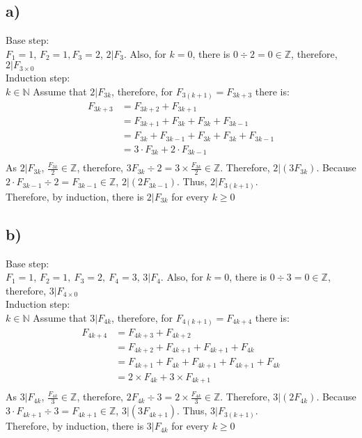 \documentclass{article}
\begin{document}
    \subsection*{a)}
        Base step:\\
        \(F_1=1\), \(F_2=1, F_3=2\), \(2|F_3\). Also, for \(k=0\), there is \(0\div 2 =0\in \mathbb{Z}\), therefore, \(2|F_{3\times 0}\)\\
        Induction step:\\
        \(k\in \mathbb{N}\) Assume that \(2|F_{3k}\), therefore, for \(F_{3(k+1)}=F_{3k+3}\) there is:
        \begin{align*}
            F_{3k+3}&=F_{3k+2}+F_{3k+1}\\
                    &=F_{3k+1}+F_{3k}+F_{3k}+F_{3k-1}\\
                    &=F_{3k}+F_{3k-1}+F_{3k}+F_{3k}+F_{3k-1}\\
                    &=3\cdot F_{3k}+2\cdot F_{3k-1}\\
        \end{align*}
        As \(2|F_{3k}\), \(\displaystyle{\frac{F_{3k}}{2}\in \mathbb{Z}}\), therefore, \(3F_{3k} \div 2=3\times \frac{F_{3k}}{2}\in \mathbb{Z}\).
        Therefore, \(2|(3 F_{3k})\). Because \(2\cdot F_{3k-1} \div 2 = F_{3k-1}\in \mathbb{Z}\), \(2|(2 F_{3k-1})\).
        Thus, \(2|F_{3(k+1)}\).\\Therefore, by induction, there is \(2|F_{3k}\) for every \(k\geqslant 0\)
    \subsection*{b)}
    Base step:\\
        \(F_1=1\), \(F_2=1,\  F_3=2,\ F_4=3\), \(3|F_4\). Also, for \(k=0\), there is \(0\div 3 =0\in \mathbb{Z}\), therefore, \(3|F_{4\times 0}\)\\
        Induction step:\\
        \(k\in \mathbb{N}\) Assume that \(3|F_{4k}\), therefore, for \(F_{4(k+1)}=F_{4k+4}\) there is:\\
        \begin{align*}
            F_{4k+4}&=F_{4k+3}+F_{4k+2}\\
                    &=F_{4k+2}+F_{4k+1}+F_{4k+1}+F_{4k}\\
                    &=F_{4k+1}+F_{4k}+F_{4k+1}+F_{4k+1}+F_{4k}\\
                    &=2\times F_{4k}+3\times F_{4k+1}\\
        \end{align*}
        As \(3|F_{4k}\), \(\displaystyle{\frac{F_{4k}}{3}\in \mathbb{Z}}\), therefore, \(2F_{4k} \div 3=2\times \frac{F_{4k}}{3}\in \mathbb{Z}\).
        Therefore, \(3|(2 F_{4k})\). Because \(3\cdot F_{4k+1} \div 3 = F_{4k+1}\in \mathbb{Z}\), \(3|(3 F_{4k+1})\).
        Thus, \(3|F_{3(k+1)}\).\\Therefore, by induction, there is \(3|F_{4k}\) for every \(k\geqslant 0\)
\newpage
\end{document}
